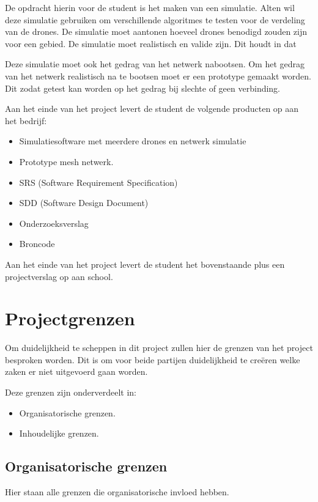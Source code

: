 \documentclass[a4paper, 11pt, oneside]{report}
\begin{document}
De opdracht hierin voor de student is het maken van een simulatie.
Alten wil deze simulatie gebruiken om verschillende algoritmes te testen voor de verdeling van de drones.
De simulatie moet aantonen hoeveel drones benodigd zouden zijn voor een gebied.
De simulatie moet realistisch en valide zijn.
Dit houdt in dat 

Deze simulatie moet ook het gedrag van het netwerk nabootsen.
Om het gedrag van het netwerk realistisch na te bootsen moet er een prototype gemaakt worden.
Dit zodat getest kan worden op het gedrag bij slechte of geen verbinding.

Aan het einde van het project levert de student de volgende producten op aan het bedrijf:

\begin{itemize}
\item Simulatiesoftware met meerdere drones en netwerk simulatie
\item Prototype mesh netwerk.
\item SRS (Software Requirement Specification)
\item SDD (Software Design Document)
\item Onderzoeksverslag
\item Broncode
\end{itemize}

Aan het einde van het project levert de student het bovenstaande plus een projectverslag op aan school.


\chapter{Projectgrenzen}
\label{chapter:projectgrenzen}
Om duidelijkheid te scheppen in dit project zullen hier de grenzen van het project besproken worden.
Dit is om voor beide partijen duidelijkheid te creëren welke zaken er niet uitgevoerd gaan worden. 

Deze grenzen zijn onderverdeelt in:

\begin{itemize}
	\item Organisatorische grenzen.
	\item Inhoudelijke grenzen.
\end{itemize}

\section{Organisatorische grenzen}
Hier staan alle grenzen die organisatorische invloed hebben. 
\end{document}
